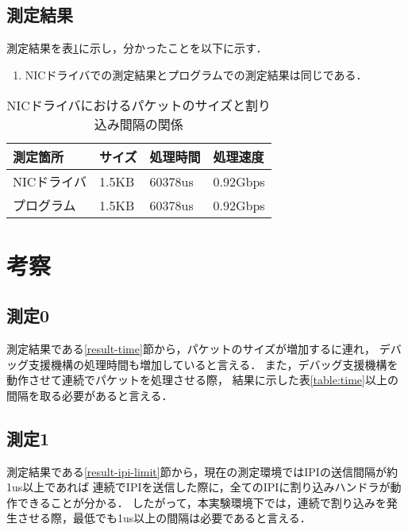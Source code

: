 \documentclass[12pt]{jsarticle}
\begin{document}
\subsection{測定結果}\label{result-nic}

測定結果を表\ref{table:nic-time}に示し，分かったことを以下に示す．
\begin{enumerate}
    \item NICドライバでの測定結果とプログラムでの測定結果は同じである．
\end{enumerate}

\begin{table}[h]
    \caption{NICドライバにおけるパケットのサイズと割り込み間隔の関係}
    \label{table:nic-time}
    \begin{center}
        \begin{tabular}{l|l|l|l}   \hline \hline 
            測定箇所   & サイズ      & 処理時間      & 処理速度        \\ \hline
            NICドライバ& 1.5KB       & 60378us       & 0.92Gbps        \\ 
            プログラム & 1.5KB       & 60378us       & 0.92Gbps        \\ \hline
        \end{tabular}
    \end{center}
\end{table}

\section{考察}

\subsection{測定0}

測定結果である\ref{result-time}節から，パケットのサイズが増加するに連れ，
デバッグ支援機構の処理時間も増加していると言える．
また，デバッグ支援機構を動作させて連続でパケットを処理させる際，
結果に示した表\ref{table:time}以上の間隔を取る必要があると言える．

\subsection{測定1}

測定結果である\ref{result-ipi-limit}節から，現在の測定環境ではIPIの送信間隔が約1us以上であれば
連続でIPIを送信した際に，全てのIPIに割り込みハンドラが動作できることが分かる．
したがって，本実験環境下では，連続で割り込みを発生させる際，最低でも1us以上の間隔は必要であると言える．
\end{document}
